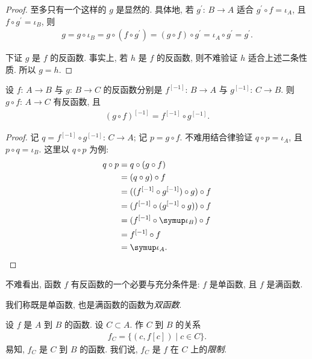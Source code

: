 \begin{proof}
    至多只有一个这样的 $g$ 是显然的. 具体地, 若 $g^{\prime}$: $B \to A$ 适合 $g^{\prime} \circ f = \iota_A$, 且 $f \circ g^{\prime} = \iota_B$, 则
    \begin{align*}
        g = g \circ \iota_B = g \circ (f \circ g^{\prime}) = (g \circ f) \circ g^{\prime} = \iota_A \circ g^{\prime} = g^{\prime}.
    \end{align*}

    下证 $g$ 是 $f$ 的反函数. 事实上, 若 $h$ 是 $f$ 的反函数, 则不难验证 $h$ 适合上述二条性质. 所以 $g = h$.
\end{proof}

\begin{theorem}
    设 $f$: $A \to B$ 与 $g$: $B \to C$ 的反函数分别是 $f^{[-1]}$: $B \to A$ 与 $g^{[-1]}$: $C \to B$. 则 $g \circ f$: $A \to C$ 有反函数, 且
    \begin{align*}
        {(g \circ f)}^{[-1]} = f^{[-1]} \circ g^{[-1]}.
    \end{align*}
\end{theorem}

\begin{proof}
    记 $q = f^{[-1]} \circ g^{[-1]}$: $C \to A$; 记 $p = g \circ f$. 不难用结合律验证 $q \circ p = \iota_A$, 且 $p \circ q = \iota_B$. 这里以 $q \circ p$ 为例:
    \begin{align*}
        q \circ p
        = {} & q \circ (g \circ f)                         \\
        = {} & (q \circ g) \circ f                         \\
        = {} & ((f^{[-1]} \circ g^{[-1]}) \circ g) \circ f \\
        = {} & (f^{[-1]} \circ (g^{[-1]} \circ g)) \circ f \\
        = {} & (f^{[-1]} \circ \iota_B) \circ f            \\
        = {} & f^{[-1]} \circ f                            \\
        = {} & \iota_A. \qedhere
    \end{align*}
\end{proof}

\begin{remark}
    不难看出, 函数 $f$ 有反函数的一个必要与充分条件是: $f$ 是单函数, 且 $f$ 是满函数.

    我们称既是单函数, 也是满函数的函数为\emph{双函数}.
\end{remark}

\begin{definition}
    设 $f$ 是 $A$ 到 $B$ 的函数. 设 $C \subset A$. 作 $C$ 到 $B$ 的关系
    \begin{align*}
        f_C = \{ (c, f[c]) \mid c \in C \}.
    \end{align*}
    易知, $f_C$ 是 $C$ 到 $B$ 的函数. 我们说, $f_C$ 是 $f$ 在 $C$ 上的\emph{限制}.
\end{definition}

